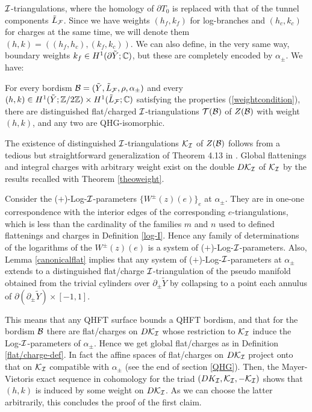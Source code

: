${\mathcal I}$-triangulations, where the homology of $\partial T_0$ is replaced
with that of the tunnel components $\tilde{L}_{\mathcal F}$. Since we have
weights $(h_f,k_f)$ for log-branches and $(h_c,k_c)$ for charges at
the same time, we will denote them $(h,k)=((h_f,h_c),(k_f,k_c))$. We
can also define, in the very same way, boundary weights $k_f\in
H^1(\partial \tilde{Y}; \mathbb{C})$, but these are completely encoded by
$\alpha_\pm$. We have:
\begin{teo} \label{teoTOP} For every bordism
${\mathcal B}=(\tilde{Y},\tilde{L}_{\mathcal F},\rho,\alpha_\pm)$ and every $(h,k)
\in H^1(\tilde{Y};{\mathbb Z}/2{\mathbb Z}) \times H^1(\tilde{L}_{\mathcal F}; \mathbb{C})$
satisfying the properties (\ref{weightcondition}), there are
distinguished flat/charged ${\mathcal I}$-triangulations ${\mathcal T}({\mathcal B})$ of
$Z({\mathcal B})$ with weight $(h,k)$, and any two are QHG-isomorphic.
\end{teo}

 The existence of distinguished
${\mathcal I}$-triangulations ${\mathcal K}_{\mathcal I}$ of $Z({\mathcal B})$ follows from a tedious
but straightforward generalization of Theorem 4.13 in \cite{BB1}.
Global flattenings and integral charges with arbitrary weight
exist on the double $D{\mathcal K}_{\mathcal I}$ of ${\mathcal K}_{\mathcal I}$ by the results
recalled with Theorem \ref{theoweight}.

Consider the ($+$)-Log-${\mathcal I}$-parameters $\{W^\pm(z)(e)\}_e$ at
$\alpha_\pm$. They are in one-one correspondence with the interior
edges of the corresponding $e$-triangulations, which is less than the
cardinality of the families $m$ and $n$ used to defined flattenings
and charges in Definition \ref{log-I}. Hence any family of
determinations of the logarithms of the $W^\pm(z)(e)$ is a system of
($+$)-Log-${\mathcal I}$-parameters. Also, Lemma \ref{canonicalflat} implies
that any system of ($+$)-Log-${\mathcal I}$-parameters at $\alpha_\pm$ extends
to a distinguished flat/charge ${\mathcal I}$-triangulation of the pseudo
manifold obtained from the trivial cylinders over
$\partial_{\pm}\tilde{Y}$ by collapsing to a point each annulus of
$\partial( \partial_{\pm}\tilde{Y}) \times [-1,1]$.

This means that any QHFT surface bounds a QHFT bordism, and that
for the bordism ${\mathcal B}$ there are flat/charges on $D{\mathcal K}_{\mathcal I}$ whose
restriction to ${\mathcal K}_{\mathcal I}$ induce the Log-${\mathcal I}$-parameters of
$\alpha_\pm$. Hence we get global flat/charges as in Definition
\ref{flat/charge-def}. In fact the affine spaces of flat/charges
on $D{\mathcal K}_{\mathcal I}$ project onto that on ${\mathcal K}_{\mathcal I}$ compatible with
$\alpha_\pm$ (see the end of section \ref{QHG}). Then, the
Mayer-Vietoris exact sequence in cohomology for the triad
$(DK_{\mathcal I},{\mathcal K}_{\mathcal I},-{\mathcal K}_{\mathcal I})$ shows that $(h,k)$ is induced by some
weight on $D{\mathcal K}_{\mathcal I}$. As we can choose the latter arbitrarily,
this concludes the proof of the first claim.

